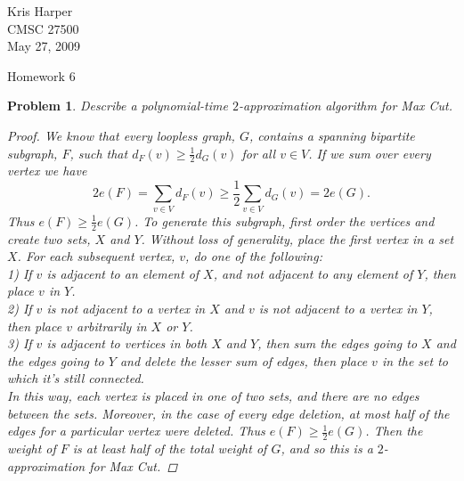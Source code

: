 \documentclass{article}
\newtheorem{problem}{Problem}
\begin{document}
\begin{flushright}
Kris Harper\\

CMSC 27500\\

May 27, 2009
\end{flushright}

\begin{center}
Homework 6
\end{center}

\begin{problem}
Describe a polynomial-time $2$-approximation algorithm for Max Cut.
\begin{proof}
We know that every loopless graph, $G$, contains a spanning bipartite subgraph, $F$, such that $d_F(v) \geq \frac{1}{2} d_G (v)$ for all $v \in V$. If we sum over every vertex we have
\[
2e(F) = \sum_{v \in V} d_F(v) \geq \frac{1}{2} \sum_{v \in V} d_G(v) = 2e(G).
\]
Thus $e(F) \geq \frac{1}{2} e(G)$. To generate this subgraph, first order the vertices and create two sets, $X$ and $Y$. Without loss of generality, place the first vertex in a set $X$. For each subsequent vertex, $v$, do one of the following:\\
1) If $v$ is adjacent to an element of $X$, and not adjacent to any element of $Y$, then place $v$ in $Y$.\\
2) If $v$ is not adjacent to a vertex in $X$ and $v$ is not adjacent to a vertex in $Y$, then place $v$ arbitrarily in $X$ or $Y$.\\
3) If $v$ is adjacent to vertices in both $X$ and $Y$, then sum the edges going to $X$ and the edges going to $Y$ and delete the lesser sum of edges, then place $v$ in the set to which it's still connected.\\
In this way, each vertex is placed in one of two sets, and there are no edges between the sets. Moreover, in the case of every edge deletion, at most half of the edges for a particular vertex were deleted. Thus $e(F) \geq \frac{1}{2} e(G)$. Then the weight of $F$ is at least half of the total weight of $G$, and so this is a $2$-approximation for Max Cut.
\end{proof}
\end{problem}
\end{document}
